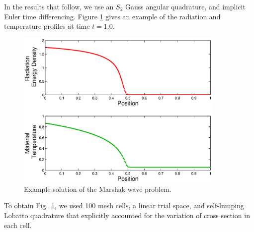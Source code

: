 \documentclass[final,3p,times]{elsarticle}
\newcommand{\fig}[1]{Fig.~\ref{#1}}                      %
\begin{document}
In the results that follow, we use an $S_2$ Gauss angular quadrature, and implicit Euler time differencing.
Figure \ref{fig:example} gives an example of the radiation and temperature profiles at time $t=1.0$.
\pagebreak
\begin{figure}[!htp]
\begin{center}
\includegraphics[width=10cm]{Proposal_ex_sol.eps}
\end{center}
\caption{Example solution of the Marshak wave problem.}
\label{fig:example}
\end{figure}
To obtain \fig{fig:example}, we used 100 mesh cells, a linear trial space, and self-lumping Lobatto quadrature that explicitly accounted for the variation of cross section in each cell.
\end{document}
